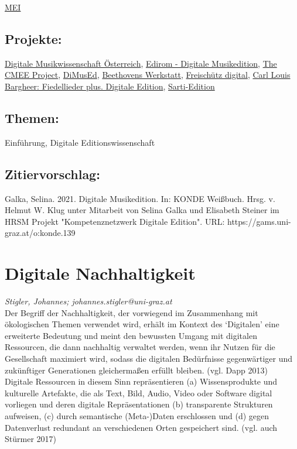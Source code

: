 \documentclass{article}
\begin{document}
\href{https://gams.uni-graz.at/o:konde.226}{MEI}\subsection*{Projekte:}\href{http://www.digital-musicology.at/de-at/}{Digitale Musikwissenschaft Österreich}, \href{https://www.edirom.de/edirom-projekt/digitale-musikedition/}{Edirom - Digitale Musikedition}, \href{https://www.cmme.org}{The CMEE Project}, \href{https://www.dimused.uni-tuebingen.de}{DiMusEd}, \href{https://beethovens-werkstatt.de}{Beethovens Werkstatt}, \href{https://freischuetz-digital.de}{Freischütz digital}, \href{https://bargheer.edirom.de}{Carl Louis Bargheer: Fiedellieder plus. Digitale Edition}, \href{https://sarti-edition.de}{Sarti-Edition}\subsection*{Themen:}Einführung, Digitale Editionswissenschaft\subsection*{Zitiervorschlag:}Galka, Selina. 2021. Digitale Musikedition. In: KONDE Weißbuch. Hrsg. v. Helmut W. Klug unter Mitarbeit von Selina Galka und Elisabeth Steiner im HRSM Projekt "Kompetenznetzwerk Digitale Edition". URL: https://gams.uni-graz.at/o:konde.139\newpage\section*{Digitale Nachhaltigkeit} \emph{Stigler, Johannes; johannes.stigler@uni-graz.at }\\
        
    Der Begriff der Nachhaltigkeit, der vorwiegend im Zusammenhang mit ökologischen Themen verwendet wird, erhält im Kontext des ‘Digitalen’ eine erweiterte Bedeutung und meint den bewussten Umgang mit digitalen Ressourcen, die dann nachhaltig verwaltet werden, wenn ihr Nutzen für die Gesellschaft maximiert wird, sodass die digitalen Bedürfnisse gegenwärtiger und zukünftiger Generationen gleichermaßen erfüllt bleiben. (vgl. Dapp 2013)\\
            
        Digitale Ressourcen in diesem Sinn repräsentieren (a) Wissensprodukte und kulturelle Artefakte, die als Text, Bild, Audio, Video oder Software digital vorliegen und deren digitale Repräsentationen (b) transparente Strukturen aufweisen, (c) durch semantische (Meta-)Daten erschlossen und (d) gegen Datenverlust redundant an verschiedenen Orten gespeichert sind. (vgl. auch Stürmer 2017)\\
            
\end{document}
